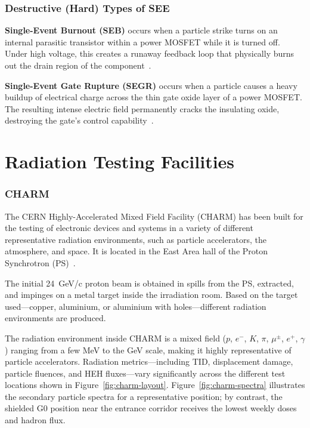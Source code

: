 \subsubsection*{Destructive (Hard) Types of SEE}

\textbf{Single-Event Burnout (SEB)} occurs when a particle strike turns on an internal parasitic transistor within a power MOSFET while it is turned off. Under high voltage, this creates a runaway feedback loop that physically burns out the drain region of the component~\cite{barbero_see_destructive_2024}.

\textbf{Single-Event Gate Rupture (SEGR)} occurs when a particle causes a heavy buildup of electrical charge across the thin gate oxide layer of a power MOSFET. The resulting intense electric field permanently cracks the insulating oxide, destroying the gate's control capability~\cite{barbero_see_destructive_2024}.

\section{Radiation Testing Facilities}
\label{section:rad-test-facilities}

\subsubsection*{CHARM}

The CERN Highly-Accelerated Mixed Field Facility (CHARM) has been built for the testing of electronic devices and systems in a variety of different representative radiation environments, such as particle accelerators, the atmosphere, and space. It is located in the East Area hall of the Proton Synchrotron (PS)~\cite{cern_charm_website}.

The initial \qty{24}{\giga\electronvolt/c} proton beam is obtained in spills from the PS, extracted, and impinges on a metal target inside the irradiation room. Based on the target used—copper, aluminium, or aluminium with holes—different radiation environments are produced. 

The radiation environment inside CHARM is a mixed field ($p$, $e^-$, $K$, $\pi$, $\mu^\pm$, $e^+$, $\gamma$) ranging from a few MeV to the GeV scale, making it highly representative of particle accelerators. Radiation metrics—including TID, displacement damage, particle fluences, and HEH fluxes—vary significantly across the different test locations shown in Figure~\ref{fig:charm-layout}. Figure~\ref{fig:charm-spectra} illustrates the secondary particle spectra for a representative position; by contrast, the shielded G0 position near the entrance corridor receives the lowest weekly doses and hadron flux.

